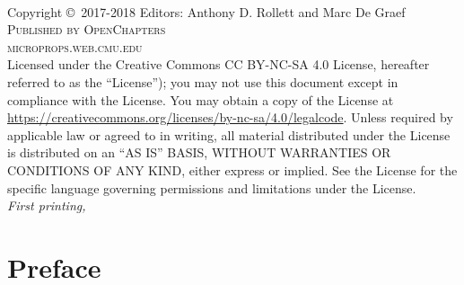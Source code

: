 \newpage
~\vfill
\thispagestyle{empty}

\noindent Copyright \copyright\ 2017-2018 Editors: Anthony D. Rollett and Marc De Graef\\ %

\noindent \textsc{Published by OpenChapters}\\ %

\noindent \textsc{microprops.web.cmu.edu}\\ %

\noindent Licensed under the Creative Commons CC BY-NC-SA 4.0 License, hereafter referred to as the ``License''); you may not
use this document except in compliance with the License. You may obtain a copy
of the License at \url{https://creativecommons.org/licenses/by-nc-sa/4.0/legalcode}. Unless
required by applicable law or agreed to in writing, all material distributed
under the License is distributed on an ``AS IS'' BASIS, WITHOUT
WARRANTIES OR CONDITIONS OF ANY KIND, either express or implied. See the
License for the specific language governing permissions and limitations
under the License.\\ %

\noindent \textit{First printing, \monthyear} %


\pagestyle{empty} %
\tableofcontents %
\cleardoublepage %
\pagestyle{fancy} %

%
%



\cleardoublepage
{} %

\chapter*{Preface}

